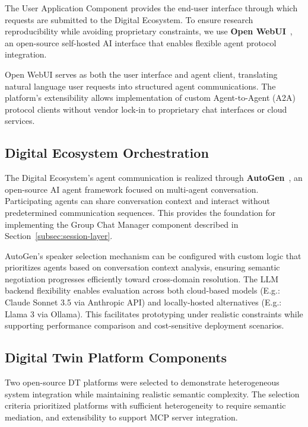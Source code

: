 The User Application Component provides the end-user interface through which
    requests are submitted to the Digital Ecosystem.
To ensure research reproducibility while avoiding proprietary constraints,
    we use \textbf{Open WebUI}~\cite{baek2025},
    an open-source self-hosted AI interface that enables flexible agent protocol integration.

Open WebUI serves as both the user interface and agent client,
    translating natural language user requests into structured agent communications.
The platform's extensibility allows implementation of custom Agent-to-Agent (A2A) protocol clients
    without vendor lock-in to proprietary chat interfaces or cloud services.

\subsection{Digital Ecosystem Orchestration}
\label{subsec:digital-ecosystem-orchestration}

The Digital Ecosystem's agent communication is realized through
    \textbf{AutoGen}~\cite{wu2024autogen},
    an open-source AI agent framework focused on multi-agent conversation.
Participating agents can
    share conversation context and
    interact without predetermined communication sequences.
This provides the foundation for implementing the
    Group Chat Manager component described in Section~\ref{subsec:session-layer}.

AutoGen's speaker selection mechanism can be configured with custom logic that
    prioritizes agents based on conversation context analysis,
    ensuring semantic negotiation progresses efficiently toward cross-domain resolution.
The LLM backend flexibility enables evaluation across both
    cloud-based models (E.g.: Claude Sonnet 3.5 via Anthropic API) and
    locally-hosted alternatives (E.g.: Llama 3 via Ollama).
This facilitates prototyping under realistic constraints while
    supporting performance comparison and cost-sensitive deployment scenarios.

\subsection{Digital Twin Platform Components}
\label{subsec:digital-twin-platform-components}

Two open-source DT platforms were selected to demonstrate heterogeneous system integration
    while maintaining realistic semantic complexity.
The selection criteria prioritized platforms with
    sufficient heterogeneity to require semantic mediation, and
    extensibility to support MCP server integration.

